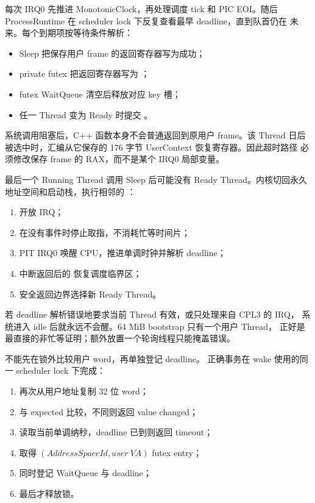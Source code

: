 每次 IRQ0 先推进 MonotonicClock，再处理调度 tick 和 PIC EOI。随后
ProcessRuntime 在 scheduler lock 下反复查看最早 deadline，直到队首仍在
未来。每个到期项按等待条件解析：

\begin{itemize}
  \item Sleep 把保存用户 frame 的返回寄存器写为成功；
  \item private futex 把返回寄存器写为 ；
  \item futex WaitQueue 清空后释放对应 key 槽；
  \item 任一 Thread 变为 Ready 时提交 。
\end{itemize}

系统调用阻塞后，C++ 函数本身不会普通返回到原用户 frame。该 Thread 日后
被选中时，汇编从它保存的 176 字节 UserContext 恢复寄存器。因此超时路径
必须修改保存 frame 的 RAX，而不是某个 IRQ0 局部变量。

最后一个 Running Thread 调用 Sleep 后可能没有 Ready Thread。内核切回永久
地址空间和启动栈，执行相邻的 ：

\begin{enumerate}
  \item {} 开放 IRQ；
  \item {} 在没有事件时停止取指，不消耗忙等时间片；
  \item PIT IRQ0 唤醒 CPU，推进单调时钟并解析 deadline；
  \item 中断返回后的  恢复调度临界区；
  \item 安全返回边界选择新 Ready Thread。
\end{enumerate}

若 deadline 解析错误地要求当前 Thread 有效，或只处理来自 CPL3 的 IRQ，
系统进入 idle 后就永远不会醒。64 MiB bootstrap 只有一个用户 Thread，
正好是最直接的非忙等证明；额外放置一个轮询线程只能掩盖错误。

 不能先在锁外比较用户 word，再单独登记 deadline。
正确事务在 wake 使用的同一 scheduler lock 下完成：

\begin{enumerate}
  \item 再次从用户地址复制 32 位 word；
  \item 与 expected 比较，不同则返回 value changed；
  \item 读取当前单调纳秒，deadline 已到则返回 timeout；
  \item 取得 \((AddressSpaceId,user\ VA)\) futex entry；
  \item 同时登记 WaitQueue 与 deadline；
  \item 最后才释放锁。
\end{enumerate}


